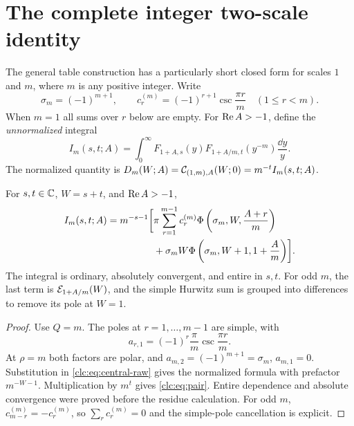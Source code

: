\section{The complete integer two-scale identity}
\label{clc:sec:two}

The general table construction has a particularly short closed form
for scales $1$ and $m$, where $m$ is any positive integer. Write
\begin{equation}\label{clc:eq:pair-data}
 \sigma_m=(-1)^{m+1},\qquad
 c_r^{(m)}=(-1)^{r+1}\csc\frac{\pi r}{m}\quad(1\le r<m).
\end{equation}
When $m=1$ all sums over $r$ below are empty.
For $\operatorname{Re} A>-1$, define the \emph{unnormalized} integral
\begin{equation}\label{clc:eq:I-def}
 I_m(s,t;A)=\int_0^\infty
 F_{1+A,s}(y)F_{1+A/m,t}(y^{-m})\frac{\dd y}{y}.
\end{equation}
The normalized quantity is
$D_m(W;A)=\mathcal C_{(1,m),A}(W;0)=m^{-t}I_m(s,t;A)$.

\begin{theorem}
\label{clc:thm:pair}
For $s,t\in\mathbb C$, $W=s+t$, and $\operatorname{Re} A>-1$,
\begin{align}
 I_m(s,t;A)=m^{-s-1}\biggl[&
 \pi\sum_{r=1}^{m-1}c_r^{(m)}
       \Phi\left(\sigma_m,W,\frac{A+r}{m}\right)\notag\\
 &+\sigma_m W\Phi\left(\sigma_m,W+1,1+\frac A m\right)\biggr].
 \label{clc:eq:pair}
\end{align}
The integral is ordinary, absolutely convergent, and entire in $s,t$.
For odd $m$, the last term is $\mathcal E_{1+A/m}(W)$, and the simple Hurwitz
sum is grouped into differences to remove its pole at $W=1$.
\end{theorem}
\begin{proof}
Use $Q=m$. The poles at $r=1,\ldots,m-1$ are simple, with
\[
 a_{r,1}=(-1)^r\frac\pi m\csc\frac{\pi r}{m}.
\]
At $\rho=m$ both factors are polar, and
$a_{m,2}=(-1)^{m+1}=\sigma_m$, $a_{m,1}=0$.
Substitution in \eqref{clc:eq:central-raw} gives the normalized formula
with prefactor $m^{-W-1}$. Multiplication by $m^t$ gives
\eqref{clc:eq:pair}. Entire dependence and absolute convergence were
proved before the residue calculation. For odd $m$,
$c_{m-r}^{(m)}=-c_r^{(m)}$, so $\sum_rc_r^{(m)}=0$ and the
simple-pole cancellation is explicit.
\end{proof}

